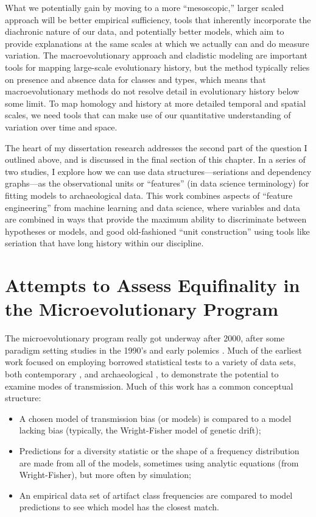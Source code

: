 What we potentially gain by moving to a more ``mesoscopic,'' larger scaled approach will be better empirical sufficiency, tools that inherently incorporate the diachronic nature of our data, and potentially better models, which aim to provide explanations at the same scales at which we actually can and do measure variation.  The macroevolutionary approach and cladistic modeling are important tools for mapping large-scale evolutionary history, but the method typically relies on presence and absence data for classes and types, which means that macroevolutionary methods do not resolve detail in evolutionary history below some limit.  To map homology and history at more detailed temporal and spatial scales, we need tools that can make use of our quantitative understanding of variation over time and space.  

The heart of my dissertation research addresses the second part of the question I outlined above, and is discussed in the final section of this chapter.  In a series of two studies, I explore how we can use data structures---seriations and dependency graphs---as the observational units or ``features'' (in data science terminology) for fitting models to archaeological data.  This work combines aspects of ``feature engineering'' from machine learning and data science, where variables and data are combined in ways that provide the maximum ability to discriminate between hypotheses or models, and good old-fashioned ``unit construction'' using tools like seriation that have long history within our discipline.  

\section{Attempts to Assess Equifinality in the Microevolutionary Program}

The microevolutionary program really got underway after 2000, after some paradigm setting studies in the 1990's and early polemics \citep{Dunnell1978,Dunnell1989,Neiman1990,Neiman1995}.  Much of the earliest work focused on employing borrowed statistical tests to a variety of data sets, both contemporary , and archaeological , to demonstrate the potential to examine modes of transmission.  Much of this work has a common conceptual structure:

\begin{itemize}
    \item A chosen model of transmission bias (or models) is compared to a model lacking bias (typically, the Wright-Fisher model of genetic drift);
    \item Predictions for a diversity statistic or the shape of a frequency distribution are made from all of the models, sometimes using analytic equations (from Wright-Fisher), but more often by simulation;
    \item An empirical data set of artifact class frequencies are compared to model predictions to see which model has the closest match.
\end{itemize}

